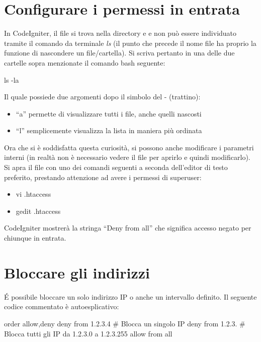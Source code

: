 \section*{Configurare i permessi in entrata}
In CodeIgniter, il file  si trova nella directory  e  e non può essere individuato tramite il comando da terminale \textit{ls} (il punto che precede il nome file ha proprio la funzione di nascondere un file/cartella). Si scriva pertanto in una delle due cartelle sopra menzionate il comando bash seguente:

\begin{code}
ls -la
\end{code}

Il quale possiede due argomenti dopo il simbolo del - (trattino):

\begin{itemize}
\item ``a'' permette di visualizzare tutti i file, anche quelli nascosti
\item ``l'' semplicemente visualizza la lista in maniera più ordinata
\end{itemize}

Ora che si è soddisfatta questa curiosità, si possono anche modificare i parametri interni (in realtà non è necessario vedere il file per aprirlo e quindi modificarlo). Si apra il file con uno dei comandi seguenti a seconda dell'editor di testo preferito, prestando attenzione ad avere i permessi di superuser:

\begin{itemize}
\item vi .htaccess
\item gedit .htaccess
\end{itemize}

CodeIgniter mostrerà la stringa ``Deny from all'' che significa accesso negato per chiunque in entrata.

\section*{Bloccare gli indirizzi}
\'E possibile bloccare un solo indirizzo IP o anche un intervallo definito. Il seguente codice commentato è autoesplicativo:

\begin{code}
order allow,deny
deny from 1.2.3.4           # Blocca un singolo IP
deny from 1.2.3.            # Blocca tutti gli IP da 1.2.3.0 a 1.2.3.255
allow from all
\end{code}

